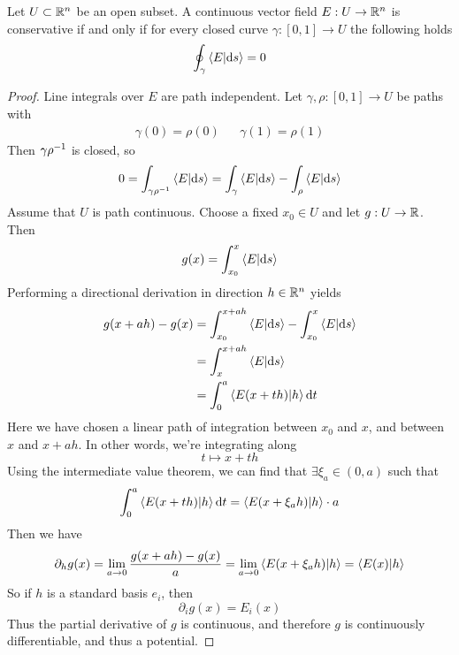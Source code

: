 \documentclass[../../script.tex]{subfiles}
\begin{document}
\begin{thm}
    Let $U \subset \mathbb{R}^n$ be an open subset. A continuous vector field $E: U \rightarrow \mathbb{R}^n$ is conservative if and only if 
    for every closed curve $\gamma: [0, 1] \rightarrow U$ the following holds
    \[
        \oint_{\gamma} \innerproduct{E}{\dd{s}} = 0
    \]
\end{thm}
\begin{proof}
    Line integrals over $E$ are path independent. Let $\gamma, \rho: [0, 1] \rightarrow U$ be paths with 
    \begin{align}
        \gamma(0) = \rho(0) && \gamma(1) = \rho(1)
    \end{align}
    Then $\gamma {\rho}^{-1}$ is closed, so 
    \begin{equation}
        0 = \int_{\gamma\inv{\rho}} \innerproduct{E}{\dd{s}} = \int_{\gamma} \innerproduct{E}{\dd{s}} - \int_{\rho} \innerproduct{E}{\dd{s}}
    \end{equation}
    Assume that $U$ is path continuous. Choose a fixed $x_0 \in U$ and let $g: U \rightarrow \mathbb{R}$. Then 
    \begin{equation}
        g(x) = \int_{x_0}^x \innerproduct{E}{\dd{s}}
    \end{equation}
    Performing a directional derivation in direction $h \in \mathbb{R}^n$ yields
    \begin{equation}
        \begin{split}
            g(x + ah) - g(x) &= \int_{x_0}^{x + ah} \innerproduct{E}{\dd{s}} - \int_{x_0}^x \innerproduct{E}{\dd{s}} \\
            &= \int_{x}^{x + ah} \innerproduct{E}{\dd{s}} \\
            &= \int_0^a \innerproduct{E(x + th)}{h} \dd{t}
        \end{split}
    \end{equation}
    Here we have chosen a linear path of integration between $x_0$ and $x$, and between $x$ and $x + ah$. In other words, we're integrating along 
    \begin{equation}
        t \longmapsto x + th
    \end{equation}
    Using the intermediate value theorem, we can find that $\exists \xi_a \in (0, a)$ such that 
    \begin{equation}
        \int_0^a \innerproduct{E(x + th)}{h} \dd{t} = \innerproduct{E(x + \xi_a h)}{h} \cdot a
    \end{equation}
    Then we have 
    \begin{equation}
        \partial_h g(x) = \limes{a}{0} \frac{g(x + ah) - g(x)}{a} = \limes{a}{0} \innerproduct{E(x + \xi_a h)}{h} = \innerproduct{E(x)}{h}
    \end{equation}
    So if $h$ is a standard basis $e_i$, then 
    \begin{equation}
        \partial_i g(x) = E_i(x)
    \end{equation}
    Thus the partial derivative of $g$ is continuous, and therefore $g$ is continuously differentiable, and thus a potential.
\end{proof}
\end{document}

